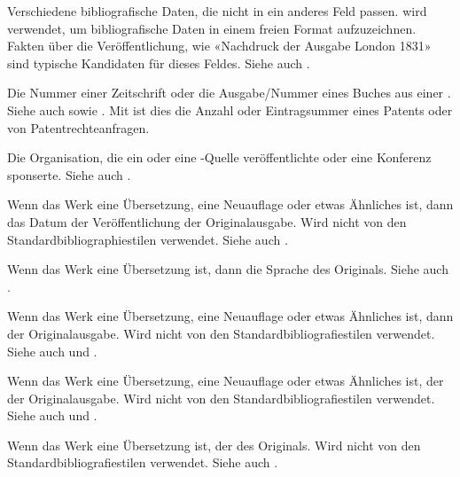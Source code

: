 \documentclass{ltxdockit}[2011/03/25]
\begin{document}
\begin{fieldlist}

Verschiedene bibliografische Daten, die nicht in ein anderes Feld passen.
  wird verwendet, um bibliografische Daten in einem freien
Format aufzuzeichnen. Fakten über die Veröffentlichung, wie «Nachdruck der
Ausgabe London 1831» sind typische Kandidaten für dieses Feldes. Siehe auch
.


Die Nummer einer Zeitschrift oder die Ausgabe\slash Nummer eines Buches aus
einer . Siehe auch  sowie . Mit  ist dies die Anzahl oder
Eintragsummer eines Patents oder von Patentrechteanfragen.


Die Organisation, die ein  oder eine -Quelle
veröffentlichte oder eine Konferenz sponserte. Siehe auch .


Wenn das Werk eine Übersetzung, eine Neuauflage oder etwas Ähnliches ist, dann
das Datum der Veröffentlichung der Originalausgabe. Wird nicht von den
Standardbibliographiestilen verwendet. Siehe auch .


Wenn das Werk eine Übersetzung ist, dann die Sprache des Originals. Siehe auch
.


Wenn das Werk eine Übersetzung, eine Neuauflage oder etwas Ähnliches ist, dann
 der Originalausgabe. Wird nicht von den
Standardbibliografiestilen verwendet. Siehe auch  und
.


Wenn das Werk eine Übersetzung, eine Neuauflage oder etwas Ähnliches ist, der
 der Originalausgabe. Wird nicht von den
Standardbibliografiestilen verwendet. Siehe auch  und
.


Wenn das Werk eine Übersetzung ist, der  des Originals. Wird
nicht von den Standardbibliografiestilen verwendet. Siehe auch
.



\end{fieldlist}
\end{document}
